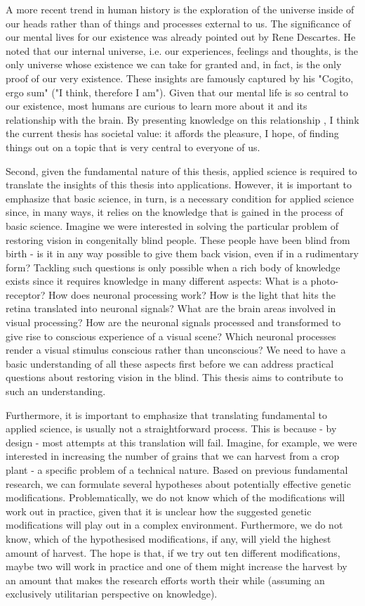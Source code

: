 A more recent trend in human history is the exploration of the universe inside of our heads rather than of things and processes external to us. The significance of our mental lives for our existence was already pointed out by Rene Descartes. He noted that our internal universe, i.e. our experiences, feelings and thoughts, is the only universe whose existence we can take for granted and, in fact, is the only proof of our very existence. These insights are famously captured by his "Cogito, ergo sum" ("I think, therefore I am"). Given that our mental life is so central to our existence, most humans are curious to learn more about it and its relationship with the brain. By presenting knowledge on this relationship , I think the current thesis has societal value: it affords the pleasure, I hope, of finding things out on a topic that is very central to everyone of us.

Second, given the fundamental nature of this thesis, applied science is required to translate the insights of this thesis into applications. However, it is important to emphasize that basic science, in turn, is a necessary condition for applied science since, in many ways, it relies on the knowledge that is gained in the process of basic science. Imagine we were interested in solving the particular problem of restoring vision in congenitally blind people. These people have been blind from birth - is it in any way possible to give them back vision, even if in a rudimentary form? Tackling such questions is only possible when a rich body of knowledge exists since it requires knowledge in many different aspects: What is a photo-receptor? How does neuronal processing work? How is the light that hits the retina translated into neuronal signals? What are the brain areas involved in visual processing? How are the neuronal signals processed and transformed to give rise to conscious experience of a visual scene? Which neuronal processes render a visual stimulus conscious rather than unconscious? We need to have a basic understanding of all these aspects first before we can address practical questions about restoring vision in the blind. This thesis aims to contribute to such an understanding.

Furthermore, it is important to emphasize that translating fundamental to applied science, is usually not a straightforward process. This is because - by design - most attempts at this translation will fail. Imagine, for example, we were interested in increasing the number of grains that we can harvest from a crop plant - a specific problem of a technical nature. Based on previous fundamental research, we can formulate several hypotheses about potentially effective genetic modifications. Problematically, we do not know which of the modifications will work out in practice, given that it is unclear how the suggested genetic modifications will play out in a complex environment. Furthermore, we do not know, which of the hypothesised modifications, if any, will yield the highest amount of harvest. The hope is that, if we try out ten different modifications, maybe two will work in practice and one of them might increase the harvest by an amount that makes the research efforts worth their while (assuming an exclusively utilitarian perspective on knowledge).

